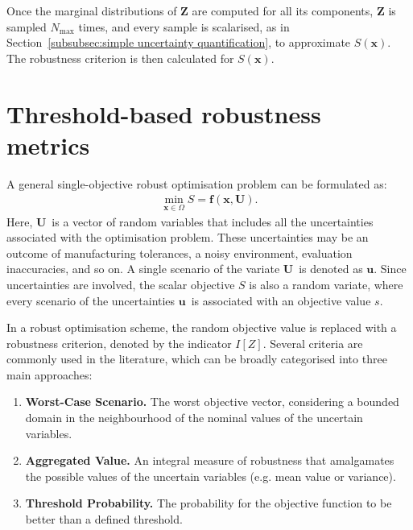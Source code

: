 \documentclass[a4paper]{article}
\newcommand{\brr}[1]{{\left({#1}\right)}} %
\newcommand{\I}[1]{\ensuremath{I\!\left[{#1}\right]}} %
\newcommand{\vx}{\ensuremath{\mathbf{x}}} %
\newcommand{\vf}{\ensuremath{\mathbf{f}}} %
\newcommand{\vZ}{\ensuremath{\mathbf{Z}}} %
\newcommand{\vu}{\ensuremath{\mathbf{u}}} %
\newcommand{\vU}{\ensuremath{\mathbf{U}}} %
\begin{document}
Once the marginal distributions of $\vZ$ are computed for all its components, $\vZ$ is sampled $N_\text{max}$ times, and every sample is scalarised, as in Section~\ref{subsubsec:simple uncertainty quantification}, to approximate $S\brr{\vx}$. The robustness criterion is then calculated for $S\brr{\vx}$. 

\section{Threshold-based robustness metrics}
\label{sec:Robustness Indicators}
A general single-objective robust optimisation problem can be formulated as:
\begin{align}
\label{eq:rev:robust}
\min_{\vx\in\Omega} S=\vf\brr{\vx,\vU}.
\end{align}
Here, \vU\ is a vector of random variables that includes all the uncertainties associated with the optimisation problem. These uncertainties may be an outcome of manufacturing tolerances, a noisy environment, evaluation inaccuracies, and so on. A single scenario of the variate \vU\ is denoted as \vu. Since uncertainties are involved, the scalar objective $S$ is also a random variate, where every scenario of the uncertainties \vu\ is associated with an objective value $s$.

In a robust optimisation scheme, the random objective value is replaced with a robustness criterion, denoted by the indicator \I{Z}. Several criteria are commonly used in the literature, which can be broadly categorised into three main approaches:
\begin{enumerate}
%
\item \textbf{Worst-Case Scenario.} The worst objective vector, considering a bounded domain in the neighbourhood of the nominal values of the uncertain variables.
%
\item \textbf{Aggregated Value.} An integral measure of robustness that amalgamates the possible values of the uncertain variables (e.g. mean value or variance).
%
\item \textbf{Threshold Probability.} The probability for the objective function to be better than a defined threshold.
\end{enumerate}
\end{document}
